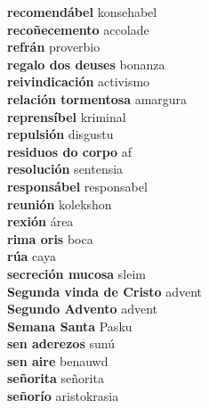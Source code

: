 \textbf{ recomendábel  } konsehabel \\
\textbf{ recoñecemento  } accolade \\
\textbf{ refrán  } proverbio \\
\textbf{ regalo dos deuses  } bonanza \\
\textbf{ reivindicación  } activismo \\
\textbf{ relación tormentosa  } amargura \\
\textbf{ reprensíbel  } kriminal \\
\textbf{ repulsión  } disgustu \\
\textbf{ residuos do corpo  } af \\
\textbf{ resolución  } sentensia \\
\textbf{ responsábel  } responsabel \\
\textbf{ reunión  } kolekshon \\
\textbf{ rexión  } área \\
\textbf{ rima oris  } boca \\
\textbf{ rúa  } caya \\
\textbf{ secreción mucosa  } sleim \\
\textbf{ Segunda vinda de Cristo  } advent \\
\textbf{ Segundo Advento  } advent \\
\textbf{ Semana Santa  } Pasku \\
\textbf{ sen aderezos  } sunú \\
\textbf{ sen aire  } benauwd \\
\textbf{ señorita  } señorita \\
\textbf{ señorío  } aristokrasia \\
